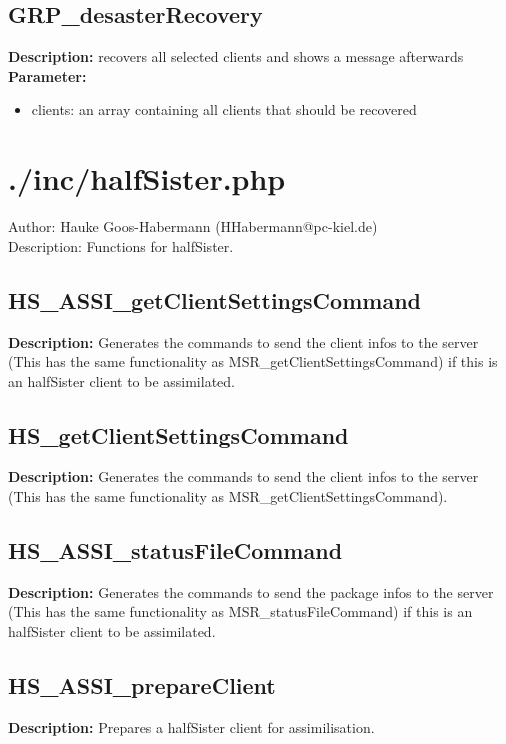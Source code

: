 \subsection{GRP\_desasterRecovery}
\textbf{Description:} recovers all selected clients and shows a message afterwards\\
\textbf{Parameter:}
\begin{itemize}
\item clients: an array containing all clients that should be recovered
\end{itemize}

\newpage\section{./inc/halfSister.php}
 Author: Hauke Goos-Habermann (HHabermann@pc-kiel.de)\\
 Description: Functions for halfSister.\\

\subsection{HS\_ASSI\_getClientSettingsCommand}
\textbf{Description:} Generates the commands to send the client infos to the server (This has the same functionality as MSR\_getClientSettingsCommand) if this is an halfSister client to be assimilated.\\

\subsection{HS\_getClientSettingsCommand}
\textbf{Description:} Generates the commands to send the client infos to the server (This has the same functionality as MSR\_getClientSettingsCommand).\\

\subsection{HS\_ASSI\_statusFileCommand}
\textbf{Description:} Generates the commands to send the package infos to the server (This has the same functionality as MSR\_statusFileCommand) if this is an halfSister client to be assimilated.\\

\subsection{HS\_ASSI\_prepareClient}
\textbf{Description:} Prepares a halfSister client for assimilisation.\\

